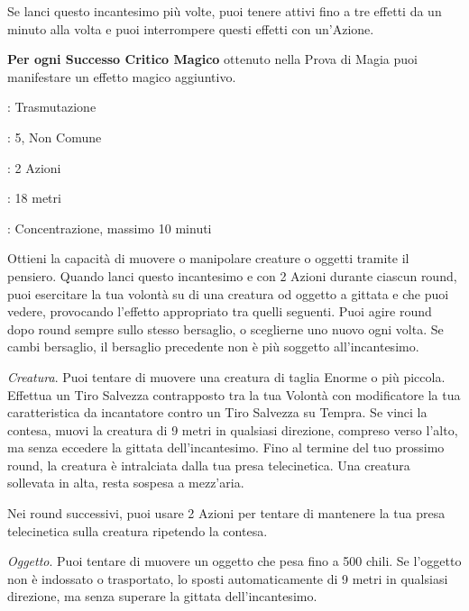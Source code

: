 \begin{multicols}{2}
Se lanci questo incantesimo più volte, puoi tenere attivi fino a tre effetti da un minuto alla volta e puoi interrompere questi effetti con un'Azione.

\textbf{Per ogni Successo Critico Magico} ottenuto nella Prova di Magia puoi manifestare un effetto magico aggiuntivo.

\noindent\colorbox{OBSSgold!10}{
\begin{minipage}{0.95\linewidth}
\begin{description}[noitemsep, topsep=0pt, parsep=0pt, partopsep=0pt, leftmargin=0cm, labelwidth=1.3cm]
	\item[\textbf{Lista}]: Trasmutazione
	\item[\textbf{Livello}]: 5, Non Comune
	\item[\textbf{Lancio}]: 2 Azioni
	\item[\textbf{Gittata}]: 18 metri
	\item[\textbf{Durata}]: Concentrazione, massimo 10 minuti
\end{description}
\end{minipage}}\smallskip

Ottieni la capacità di muovere o manipolare creature o oggetti tramite il pensiero. Quando lanci questo incantesimo e con 2 Azioni durante ciascun round, puoi esercitare la tua volontà su di una creatura od oggetto a gittata e che puoi vedere, provocando l'effetto appropriato tra quelli seguenti. Puoi agire round dopo round sempre sullo stesso bersaglio, o sceglierne uno nuovo ogni volta. Se cambi bersaglio, il bersaglio precedente non è più soggetto all'incantesimo.

\emph{Creatura}. Puoi tentare di muovere una creatura di taglia Enorme o più piccola. Effettua un Tiro Salvezza contrapposto tra la tua Volontà con modificatore la tua caratteristica da incantatore contro un Tiro Salvezza su Tempra. Se vinci la contesa, muovi la creatura di 9 metri in qualsiasi direzione, compreso verso l'alto, ma senza eccedere la gittata dell'incantesimo. Fino al termine del tuo prossimo round, la creatura è intralciata dalla tua presa telecinetica. Una creatura sollevata in alta, resta sospesa a mezz'aria.

Nei round successivi, puoi usare 2 Azioni per tentare di mantenere la tua presa telecinetica sulla creatura ripetendo la contesa.

\emph{Oggetto}. Puoi tentare di muovere un oggetto che pesa fino a 500 chili. Se l'oggetto non è indossato o trasportato, lo sposti automaticamente di 9 metri in qualsiasi direzione, ma senza superare la gittata dell'incantesimo.


\end{multicols}
